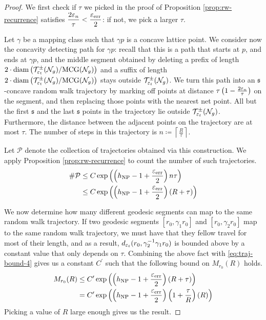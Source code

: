 \begin{proof}
  We first check if $\tau$ we picked in the proof of Proposition \ref{prop:rw-recurrence} satisfies $\displaystyle \frac{2\varepsilon_n}{\tau} < \frac{\varepsilon_{\mathrm{err}}}{2}$: if not, we pick a larger $\tau$.

  Let $\gamma$ be a mapping class such that $\gamma p$ is a concave lattice point.
  We consider now the concavity detecting path for $\gamma p$: recall that this is a path that starts at $p$, and ends at $\gamma p$, and the middle segment obtained by deleting a prefix of length $2 \cdot \mathrm{diam} \left( \mathcal{T}_{\varepsilon_t}^{\pm}(\mathcal{N}_g)/\mathrm{MCG}(\mathcal{N}_g) \right)$ and a suffix of length $2 \cdot \mathrm{diam} \left( \mathcal{T}_{\varepsilon_t}^{\pm}(\mathcal{N}_g)/\mathrm{MCG}(\mathcal{N}_g) \right)$ stays outside $\mathcal{T}_{\varepsilon_t}^{\pm}(\mathcal{N}_g)$.
  We turn this path into an $\mathfrak{s}$-concave random walk trajectory by marking off points at distance $\tau\left( 1 - \frac{2\varepsilon_n}{\tau} \right)$ on the segment, and then replacing those points with the nearest net point.
  All but the first $\mathfrak{s}$ and the last $\mathfrak{s}$ points in the trajectory lie outside $\mathcal{T}_{\varepsilon_t}^{\pm}(\mathcal{N}_g)$.
  Furthermore, the distance between the adjacent points on the trajectory are at most $\tau$.
  The number of steps in this trajectory is $\displaystyle n \coloneqq \left\lceil \frac{R}{\tau} \right\rceil$.

  Let $\mathcal{P}$ denote the collection of trajectories obtained via this construction.
  We apply Proposition \ref{prop:rw-recurrence} to count the number of such trajectories.
  \begin{align}
    \# \mathcal{P} &\leq C \exp\left(\left(h_{\mathrm{NP}} - 1 + \frac{\varepsilon_{\mathrm{err}}}{2}\right) n\tau\right) \\
                   &\leq C \exp\left(\left(h_{\mathrm{NP}} - 1 + \frac{\varepsilon_{\mathrm{err}}}{2}\right) (R + \tau)\right) \label{eq:traj-bound-4}
  \end{align}

  We now determine how many different geodesic segments can map to the same random walk trajectory.
  If two geodesic segments $[r_0, \gamma_1 r_0]$ and $[r_0, \gamma_2 r_0]$ map to the same random walk trajectory, we must have that they fellow travel for most of their length, and as a result, $d_{\varepsilon_t}(r_0, \gamma_2^{-1} \gamma_1 r_0)$ is bounded above by a constant value that only depends on $\tau$.
  Combining the above fact with \eqref{eq:traj-bound-4} gives us a constant $C^{\prime}$ such that the following bound on $M_{r_0}(R)$ holds.
  \begin{align*}
    M_{r_0}(R) &\leq C^{\prime} \exp\left(\left(h_{\mathrm{NP}} - 1 + \frac{\varepsilon_{\mathrm{err}}}{2}\right) (R + \tau)\right) \\
    &= C^{\prime} \exp\left(\left(h_{\mathrm{NP}} - 1 + \frac{\varepsilon_{\mathrm{err}}}{2}\right) \left(1 + \frac{\tau}{R}\right) (R)\right)
  \end{align*}
  Picking a value of $R$ large enough gives us the result.
\end{proof}


